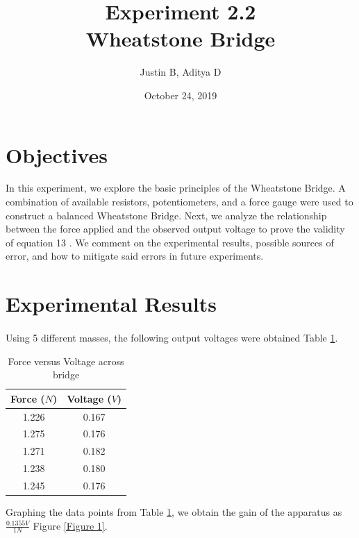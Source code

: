 \documentclass[12pt]{article}
\begin{document}
\title{Experiment 2.2\\Wheatstone Bridge}
\author{Justin B, Aditya D}
\date{October 24, 2019}
\maketitle

\newpage
\tableofcontents
\newpage 
{}

\section{Objectives}
In this experiment, we explore the basic principles of the Wheatstone Bridge.
A combination of available resistors, potentiometers, and a force gauge were used to construct a balanced Wheatstone Bridge.
Next, we analyze the relationship between the force applied and the observed output voltage to prove the validity of equation 13 \cite{labManual}.
We comment on the experimental results, possible sources of error, and how to mitigate said errors in future experiments.

\section{Experimental Results}
\paragraph*{}
Using 5 different masses, the following output voltages were obtained Table \ref{table:1}.

\begin{table}[h]
\centering
\begin{tabular}{c | c }
    Force (\(N\)) & Voltage (\(V\)) \\
    \hline
    1.226 & 0.167 \\
    1.275 & 0.176 \\
    1.271 & 0.182 \\
    1.238 & 0.180 \\
    1.245 & 0.176 \\
\end{tabular}
\caption{Force versus Voltage across bridge}
\label{table:1}
\end{table}

Graphing the data points from Table \ref{table:1}, we obtain the gain of the apparatus as \(\frac{0.1355V}{1N}\) Figure \ref{Figure 1}.
\end{document}
